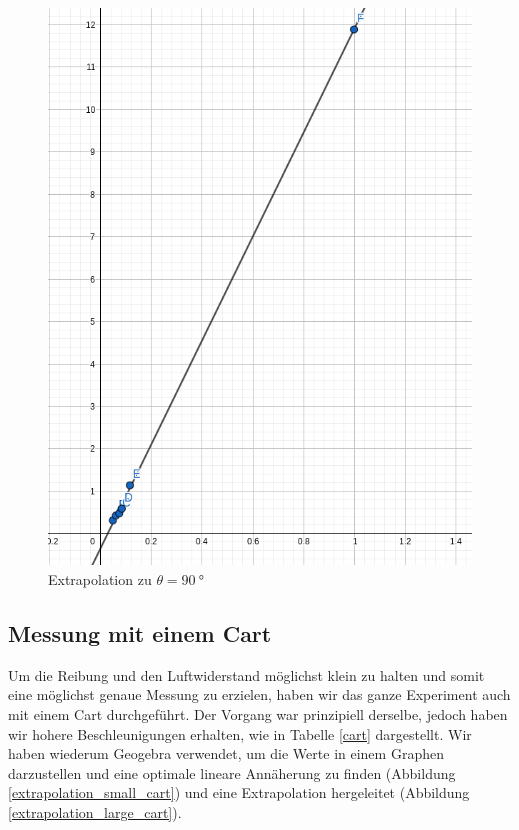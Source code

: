 \documentclass[a4paper, titlepage]{article}
\begin{document}
    \begin{figure}
       \includegraphics[width=\textwidth]{images/extrapolation_large.png}
       \caption{Extrapolation zu $\theta = \SI{90}{\degree}$}
       \label{extrapolation_large}
    \end{figure}

    \subsection{Messung mit einem Cart}
    Um die Reibung und den Luftwiderstand möglichst 
    klein zu halten und somit eine möglichst genaue
    Messung zu erzielen, haben wir das ganze Experiment
    auch mit einem Cart durchgeführt. Der Vorgang war
    prinzipiell derselbe, jedoch haben wir hohere
    Beschleunigungen erhalten, wie in Tabelle \ref{cart}
    dargestellt. Wir haben wiederum Geogebra verwendet,
    um die Werte in einem Graphen darzustellen und eine
    optimale lineare Annäherung zu finden 
    (Abbildung \ref{extrapolation_small_cart}) und
    eine Extrapolation hergeleitet 
    (Abbildung \ref{extrapolation_large_cart}).
\end{document}

